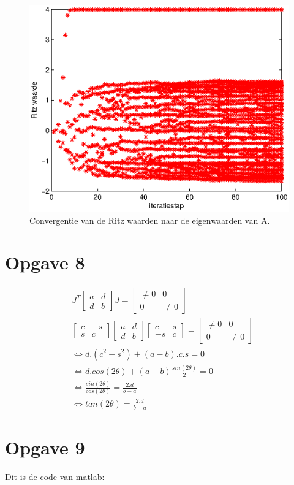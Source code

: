 \documentclass[a4paper]{article}
\newcommand{\opgave}[1]{\section*{Opgave #1}}
\begin{document}
\begin{figure}
\centerline{\includegraphics{pictures/opgave7arnoldiBeter.eps}}
\caption{Convergentie van de Ritz waarden naar de eigenwaarden van A.}
\label{fig:opgave7}
\end{figure}

\opgave{8}
\begin{algorithmic}
\State
\begin{align*}
&J^{T}
\begin{bmatrix} 
a & d \\
d & b 
\end{bmatrix}
J
=
\begin{bmatrix} 
\neq 0 & 0 \\
0 & \neq 0
\end{bmatrix}\\
&\begin{bmatrix} 
c & -s \\
s & c
\end{bmatrix}
\begin{bmatrix} 
a & d \\
d & b 
\end{bmatrix}
\begin{bmatrix} 
c & s \\
-s & c 
\end{bmatrix}
=
\begin{bmatrix} 
\neq 0 & 0 \\
0 & \neq 0
\end{bmatrix}\\
&\Leftrightarrow d.(c^2-s^2)+(a-b).c.s = 0 \\
 &\Leftrightarrow d. cos(2\theta)+(a-b) \frac{sin(2\theta)}{2}= 0\\
 &\Leftrightarrow \frac{sin(2\theta)}{cos(2\theta)} = \frac{2.d}{b-a}\\
 &\Leftrightarrow tan(2\theta) = \frac{2.d}{b-a}
\end{align*}

\end{algorithmic}
\opgave{9}
Dit is de code van matlab:

\end{document}
